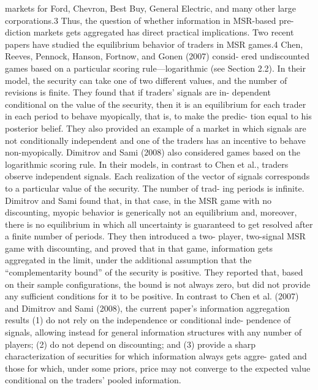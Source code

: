 {markets for Ford, Chevron, Best Buy, General Electric, and many other large corporations.3 Thus, the question of whether information in MSR-based pre- diction markets gets aggregated has direct practical implications.
Two recent papers have studied the equilibrium behavior of traders in MSR games.4 Chen, Reeves, Pennock, Hanson, Fortnow, and Gonen (2007) consid- ered undiscounted games based on a particular scoring rule—logarithmic (see Section 2.2). In their model, the security can take one of two different values, and the number of revisions is finite. They found that if traders’ signals are in- dependent conditional on the value of the security, then it is an equilibrium for each trader in each period to behave myopically, that is, to make the predic- tion equal to his posterior belief. They also provided an example of a market in which signals are not conditionally independent and one of the traders has an incentive to behave non-myopically. Dimitrov and Sami (2008) also considered games based on the logarithmic scoring rule. In their models, in contrast to Chen et al., traders observe independent signals. Each realization of the vector of signals corresponds to a particular value of the security. The number of trad- ing periods is infinite. Dimitrov and Sami found that, in that case, in the MSR game with no discounting, myopic behavior is generically not an equilibrium and, moreover, there is no equilibrium in which all uncertainty is guaranteed to get resolved after a finite number of periods. They then introduced a two- player, two-signal MSR game with discounting, and proved that in that game, information gets aggregated in the limit, under the additional assumption that the “complementarity bound” of the security is positive. They reported that, based on their sample configurations, the bound is not always zero, but did not provide any sufficient conditions for it to be positive. In contrast to Chen et al. (2007) and Dimitrov and Sami (2008), the current paper’s information aggregation results (1) do not rely on the independence or conditional inde- pendence of signals, allowing instead for general information structures with any number of players; (2) do not depend on discounting; and (3) provide a sharp characterization of securities for which information always gets aggre- gated and those for which, under some priors, price may not converge to the expected value conditional on the traders’ pooled information.}


